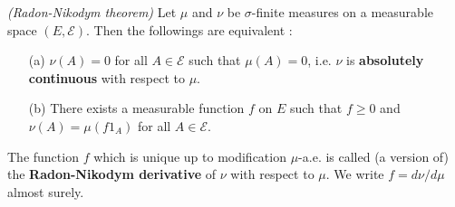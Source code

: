 \documentclass[10pt,a4paper]{report}
\begin{document}
 \emph{(Radon-Nikodym theorem)} Let $\mu$ and $\nu$ be $\sigma$-finite measures on a measurable space $(E, \mathscr{E})$. Then the followings are equivalent :
\begin{itemize}
\item[(a)] $\nu(A) =0$ for all $A\in \mathscr{E}$ such that $\mu(A) =0$, i.e. $\nu$ is \textbf{absolutely continuous} with respect to $\mu$.
\item[(b)] There exists a measurable function $f$ on $E$ such that $f\geq 0$ and $\nu(A) = \mu(f 1_A)$ for all $A\in \mathscr{E}$.
\end{itemize}
\s

The function $f$ which is unique up to modification $\mu$-a.e. is called (a version of) the \textbf{Radon-Nikodym derivative} of $\nu$ with respect to $\mu$. We write $f = d\nu /d\mu$ almost surely. 
\s
\end{document}
